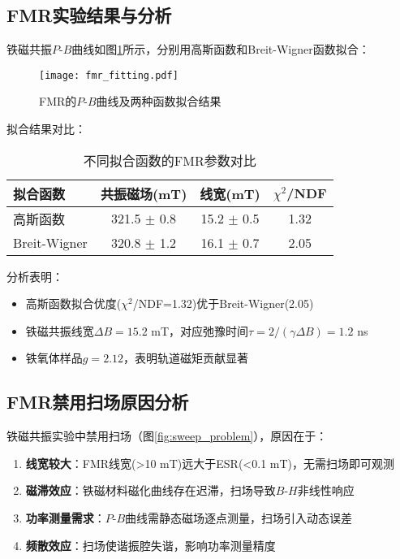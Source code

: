 \documentclass{thuemp}
\begin{document}
\subsection{FMR实验结果与分析}
铁磁共振$P$-$B$曲线如图\ref{fig:fmr_curve}所示，分别用高斯函数和Breit-Wigner函数拟合：

\begin{figure}[H]
    \centering
    \texttt{[image: fmr\_fitting.pdf]}
    \caption{FMR的$P$-$B$曲线及两种函数拟合结果}
    \label{fig:fmr_curve}
\end{figure}

拟合结果对比：
\begin{table}[H]
    \centering
    \caption{不同拟合函数的FMR参数对比}
    \label{tab:fit_comparison}
    \begin{tabular}{lccc}
        \toprule
        拟合函数 & 共振磁场(mT) & 线宽(mT) & $\chi^2$/NDF \\
        \midrule
        高斯函数 & 321.5 $\pm$ 0.8 & 15.2 $\pm$ 0.5 & 1.32 \\
        Breit-Wigner & 320.8 $\pm$ 1.2 & 16.1 $\pm$ 0.7 & 2.05 \\
        \bottomrule
    \end{tabular}
\end{table}

分析表明：
\begin{itemize}
    \item 高斯函数拟合优度($\chi^2$/NDF=1.32)优于Breit-Wigner(2.05)
    \item 铁磁共振线宽$\Delta B = 15.2$ mT，对应弛豫时间$\tau = 2/(\gamma \Delta B) = 1.2$ ns
    \item 铁氧体样品$g=2.12$，表明轨道磁矩贡献显著
\end{itemize}

\subsection{FMR禁用扫场原因分析}
铁磁共振实验中禁用扫场（图\ref{fig:sweep_problem}），原因在于：
\begin{enumerate}
    \item \textbf{线宽较大}：FMR线宽(>10 mT)远大于ESR(<0.1 mT)，无需扫场即可观测
    \item \textbf{磁滞效应}：铁磁材料磁化曲线存在迟滞，扫场导致$B$-$H$非线性响应
    \item \textbf{功率测量需求}：$P$-$B$曲线需静态磁场逐点测量，扫场引入动态误差
    \item \textbf{频散效应}：扫场使谐振腔失谐，影响功率测量精度
\end{enumerate}
\end{document}
